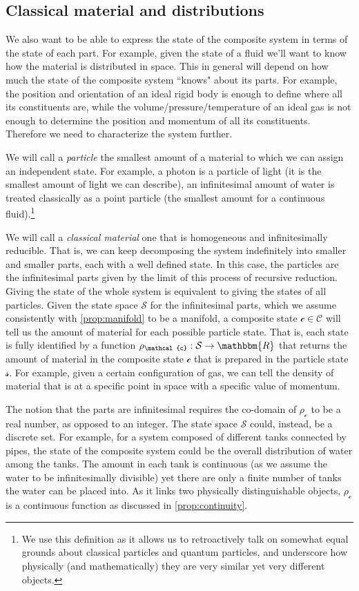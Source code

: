 \documentclass[aps,pra,10pt,twocolumn,floatfix,nofootinbib]{revtex4-1}
\numberwithin{equation}{section}
\theoremstyle{definition}
\begin{document}
\subsection{Classical material and distributions}
We also want to be able to express the state of the composite system in terms of the state of each part. For example, given the state of a fluid we'll want to know how the material is distributed in space. This in general will depend on how much the state of the composite system ``knows" about its parts. For example, the position and orientation of an ideal rigid body is enough to define where all its constituents are, while the volume/pressure/temperature of an ideal gas is not enough to determine the position and momentum of all its constituents. Therefore we need to characterize the system further.

We will call a \emph{particle} the smallest amount of a material to which we can assign an independent state. For example, a photon is a particle of light (it is the smallest amount of light we can describe), an infinitesimal amount of water is treated classically as a point particle (the smallest amount for a continuous fluid).\footnote{We use this definition as it allows us to retroactively talk on somewhat equal grounds about classical particles and quantum particles, and underscore how physically (and mathematically) they are very similar yet very different objects.}

We will call a \emph{classical material} one that is homogeneous and infinitesimally reducible. That is, we can keep decomposing the system indefinitely into smaller and smaller parts, each with a well defined state. In this case, the particles are the infinitesimal parts given by the limit of this process of recursive reduction. Giving the state of the whole system is equivalent to giving the states of all particles. Given the state space $\mathcal{S}$ for the infinitesimal parts, which we assume consistently with \ref{prop:manifold} to be a manifold, a composite state $\mathcal{c} \in \mathcal{C}$ will tell us the amount of material for each possible particle state. That is, each state is fully identified by a function $\rho_\mathcal{c}: \mathcal{S} \to \mathbbm{R}$ that returns the amount of material in the composite state $\mathcal{c}$ that is prepared in the particle state $\mathcal{s}$. For example, given a certain configuration of gas, we can tell the density of material that is at a specific point in space with a specific value of momentum.

The notion that the parts are infinitesimal requires the co-domain of $\rho_\mathcal{c}$ to be a real number, as opposed to an integer. The state space $\mathcal{S}$ could, instead, be a discrete set. For example, for a system composed of different tanks connected by pipes, the state of the composite system could be the overall distribution of water among the tanks. The amount in each tank is continuous (as we assume the water to be infinitesimally divisible) yet there are only a finite number of tanks the water can be placed into. As it links two physically distinguishable objects, $\rho_\mathcal{c}$ is a continuous function as discussed in \ref{prop:continuity}.
\end{document}
